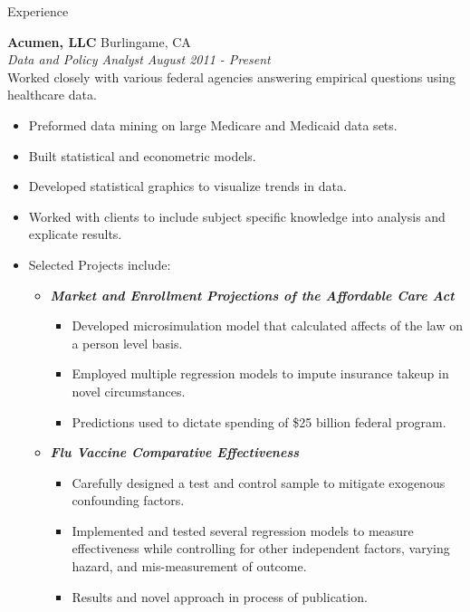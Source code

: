 \documentclass{resume} %
\begin{document}
\begin{rSection}{Experience}

\vspace{0.2em}

{\bf Acumen, LLC} \hfill Burlingame, CA \\
{\em Data and Policy Analyst} \hfill {\em August 2011 - Present} \vspace{0.3em} \\
Worked closely with various federal agencies answering empirical questions using healthcare data.
\vspace{-0.2em}
\begin{itemize} \itemsep -0.2em
	\item Preformed data mining on large Medicare and Medicaid data sets.
    \item Built statistical and econometric models.
    \item Developed statistical graphics to visualize trends in data.
    \item Worked with clients to include subject specific knowledge into analysis and explicate results.
    \item Selected Projects include:
    \begin{itemize} \itemsep -0.2em
    	\item {\bf \em Market and Enrollment Projections of the Affordable Care 		Act}
        \begin{itemize} \itemsep -0.2em
    		\item Developed microsimulation model that calculated affects of the law on a person level basis. 	
            \item Employed multiple regression models to impute insurance takeup in novel circumstances. 
            \item Predictions used to dictate spending of \$25 billion federal program.
    	\end{itemize}
    	\item {\bf \em Flu Vaccine Comparative Effectiveness}
        \begin{itemize} \itemsep -0.2em
    		\item Carefully designed a test and control sample to mitigate exogenous confounding factors.
            \item Implemented and tested several regression models to measure effectiveness while controlling for other independent factors, varying hazard, and mis-measurement of outcome.
            \item Results and novel approach in process of publication.

\end{itemize}
\end{itemize}
\end{itemize}
\end{rSection}
\end{document}

